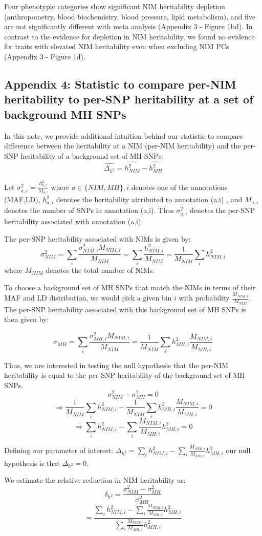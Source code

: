 Four phenotypic categories show significant NIM heritability depletion (anthropometry, blood biochemistry, blood pressure, lipid metabolism), and five are not significantly different with meta analysis (Appendix 3 - Figure 1bd). In contrast to the evidence for depletion in NIM heritability, we found no evidence for traits with elevated NIM heritability even when excluding NIM PCs (Appendix 3 - Figure 1d).

\subsection{Appendix 4: Statistic to compare per-NIM heritability to per-SNP heritability at a set of background MH SNPs}
In this note, we provide additional intuition behind our statistic to compare difference between the heritability at a NIM (per-NIM heritability) and the per-SNP heritability of a background set of MH SNPs:
$$ \hat{\Delta_{h^2}} = \hat{h^2_{NIM}} - \hat{h_{MH}^2}$$

Let $\sigma^2_{a,i} = \frac{h^2_{a,i}}{M_{a,i}}$ where $a \in\{NIM,MH\},i$  denotes one of the annotations (MAF,LD), $h_{a,i}^2$ denotes the heritability attributed to annotation (a,i) , and $M_{a,i}$ denotes the number of SNPs in annotation (a,i). Thus $\sigma_{a,i}^2$ denotes the per-SNP heritability associated with annotation (a,i). 

The per-SNP heritability associated with NIMs is given by:
$$\sigma_{NIM}^2 = \sum_i \frac{\sigma_{NIM,i}^2 M_{NIM,i}}{M_{NIM}} = \sum_i \frac{h_{NIM,i}^2}{M_{NIM}} = \frac{1}{M_{NIM}} \sum_i h_{NIM,i}^2$$  
where $M_{NIM}$ denotes the total number of NIMs.

To choose a background set of MH SNPs that match the NIMs in terms of their MAF and LD distribution, we would pick a given bin $i$ with probability $\frac{M_{NIM,i}}{M_{NIM}}$. The per-SNP heritability associated with this background set of MH SNPs is then given by:

$$\sigma_{MH} = \sum_i \frac{\sigma_{MH,i}^2 M_{NIM,i}}{M_{NIM}}  = \frac{1}{M_{NIM}} \sum_i h_{MH,i}^2 \frac{M_{NIM,i}}{M_{MH,i}}$$ 

Thus, we are interested in testing the null hypothesis that the per-NIM heritability is equal to the per-SNP heritability of the background set of MH SNPs.
$$\sigma_{NIM}^2  - \sigma_{MH}^2  =0$$ 
$$\Rightarrow \frac{1}{M_{NIM}}  \sum_i h_{NIM,i}^2 - \frac{1}{M_{NIM}} \sum_i h_{MH,i}^2 \frac{M_{NIM,i}}{M_{MH,i}} = 0$$
$$\Rightarrow \sum_i h_{NIM,i}^2 - \sum_i \frac{M_{NIM,i}}{M_{MH,i}}h_{MH,i}^2 = 0 $$

Defining our parameter of interest: $\Delta_{h^2} =\sum_i h_{NIM,i}^2  - \sum_i \frac{M_{NIM,i}}{M_{MH,i}}h_{MH,i}^2$ 
our null  hypothesis is that $\Delta_{h^2} = 0$.

We estimate the relative reduction in NIM heritability as:
$$\delta_{h^2}  = \frac{\sigma_{NIM}^2-\sigma_{MH}^2}{\sigma_{MH}^2}$$
$$= \frac{\sum_i h_{NIM,i}^2  - \sum_i \frac{M_{NIM,i}}{M_{MH,i}}h_{MH,i}^2}{\sum_i \frac{M_{NIM,i}}{M_{MH,i}}h_{MH,i}^2}$$



